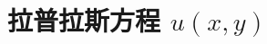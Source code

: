 \documentclass[UTF8]{report}
\theoremstyle{MyLineTheoremStyle} %
\theoremstyle{MyBlockTheoremStyle} %
\theoremstyle{MySubsubsectionStyle} %
\begin{document}
\section{拉普拉斯方程 $u(x, y)$}
\end{document}
